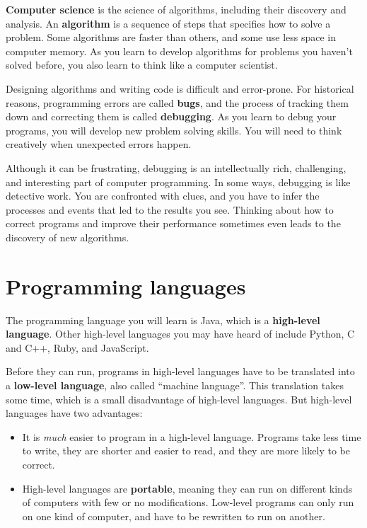 \documentclass[12pt]{book}
\theoremstyle{exercise}
\begin{document}

{\bf Computer science} is the science of algorithms, including their discovery and analysis.
An {\bf algorithm} is a sequence of steps that specifies how to solve a problem.
Some algorithms are faster than others, and some use less space in computer memory.
As you learn to develop algorithms for problems you haven't solved before, you also learn to think like a computer scientist.


Designing algorithms and writing code is difficult and error-prone.
For historical reasons, programming errors are called {\bf bugs}, and the process of tracking them down and correcting them is called {\bf debugging}.
As you learn to debug your programs, you will develop new problem solving skills.
You will need to think creatively when unexpected errors happen.

Although it can be frustrating, debugging is an intellectually rich, challenging, and interesting part of computer programming.
In some ways, debugging is like detective work.
You are confronted with clues, and you have to infer the processes and events that led to the results you see.
Thinking about how to correct programs and improve their performance sometimes even leads to the discovery of new algorithms.


\section{Programming languages}


The programming language you will learn is Java, which is a {\bf high-level language}.
Other high-level languages you may have heard of include Python, C and C++, Ruby, and JavaScript.


Before they can run, programs in high-level languages have to be translated into a {\bf low-level language}, also called ``machine language''.
This translation takes some time, which is a small disadvantage of high-level languages.
But high-level languages have two advantages:

\begin{itemize}

\item It is {\em much} easier to program in a high-level language.
Programs take less time to write, they are shorter and easier to read, and they are more likely to be correct.


\item High-level languages are {\bf portable}, meaning they can run on different kinds of computers with few or no modifications.
Low-level programs can only run on one kind of computer, and have to be rewritten to run on another.

\end{itemize}
\end{document}
